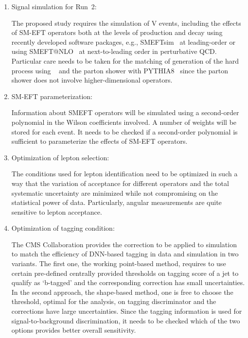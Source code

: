 \documentclass[a4paper,11pt]{article}
\newcommand{\Pb}{{{\Pqb}}\xspace}
\renewcommand{\PV}{{{{V}}}\xspace}
\newcommand{\VH}{{{\PV}{\PH}}\xspace}
\begin{document}
\begin{enumerate}

\item Signal simulation for Run~2:

The proposed study requires the simulation of \VH events, including the effects of SM-EFT operators both at the levels of production and decay using recently developed software packages, e.g., SMEFTsim~\cite{Brivio:2020onw} at leading-order or using SMEFT@NLO~\cite{Degrande:2020evl} at next-to-leading order in perturbative QCD. 
Particular care needs to be taken for the matching of generation of the hard process using {\MGvATNLO}~\cite{Alwall:2014hca} and the parton shower with PYTHIA8~\cite{Sjostrand:2014zea} 
since the parton shower does not involve higher-dimensional operators. 

\item SM-EFT parameterization:

Information about SMEFT operators will be simulated using a second-order polynomial in the Wilson coefficients involved. A number of weights will be stored for each event. 
It needs to be checked if a second-order polynomial is sufficient to parameterize the effects of SM-EFT operators.

\item Optimization of lepton selection:

The conditions used for lepton identification need to be optimized in such a way that the variation of acceptance for different operators and the total systematic uncertainty are minimized while not compromising on the statistical power of data. 
Particularly, angular measurements are quite sensitive to lepton acceptance.

\item Optimization of \Pb tagging condition: 

The CMS Collaboration provides the correction to be applied to simulation to match the efficiency of DNN-based \Pb tagging in data and simulation in two variants. 
The first one, the working point-based method, requires to use certain pre-defined centrally provided thresholds on \Pb tagging score of a jet to qualify as `b-tagged' and the corresponding correction has small uncertainties. 
In the second approach, the shape-based method, one is free to choose the threshold, optimal for the analysis, on \Pb tagging discriminator and the corrections have large uncertainties. 
Since the \Pb tagging information is used for signal-to-background discrimination, it needs to be checked which of the two options provides better overall sensitivity.  


\end{enumerate}
\end{document}
